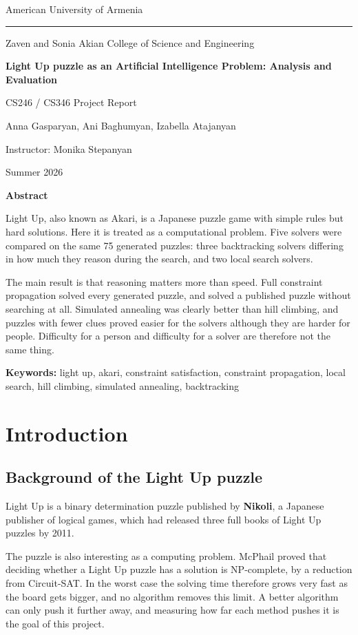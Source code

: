 \documentclass[12pt]{report}
\def\maketitle{
    \thispagestyle{empty}
    \begin{center}
        \vskip 4pt
        {\Large American University of Armenia \par}
        \vskip -7pt
        \rule{13cm}{0.05em} \par
        {\large Zaven and Sonia Akian College of Science and Engineering \par}
    \end{center}
    \vfill
    \begin{center}
        {\Huge \textbf{Light Up puzzle as an Artificial Intelligence Problem: Analysis and Evaluation} \par}
        \vspace{5mm}
        {\Large CS246 / CS346 Project Report \par}
        \vfill
        {\Large Anna Gasparyan, Ani Baghumyan, Izabella Atajanyan \par}
        \vspace{3mm}
        {\Large Instructor: Monika Stepanyan \par}
    \end{center}
    \vfill
    \begin{center}
        {\large Summer 2026 \par}
    \end{center}
    \cleardoublepage
}
\begin{document}
\maketitle

\begin{center}
    {\LARGE \textbf{Abstract}}
\end{center}
\vspace{5mm}

Light Up, also known as Akari, is a Japanese puzzle game with simple rules but hard solutions. Here it is treated as a computational problem. Five solvers were compared on the same 75 generated puzzles: three backtracking solvers differing in how much they reason during the search, and two local search solvers.

The main result is that reasoning matters more than speed. Full constraint propagation solved every generated puzzle, and solved a published puzzle without searching at all. Simulated annealing was clearly better than hill climbing, and puzzles with fewer clues proved easier for the solvers although they are harder for people. Difficulty for a person and difficulty for a solver are therefore not the same thing.


\vspace{2mm}
\textbf{Keywords:}  light up, akari, constraint satisfaction, constraint propagation, local search, hill climbing, simulated annealing, backtracking


\newpage

\tableofcontents
\listoffigures
\listoftables
\newpage

\chapter{Introduction}
\section{Background of the Light Up puzzle}
\indent 

Light Up is a binary determination puzzle published by \textbf{Nikoli}\cite{nikoli}, a Japanese publisher of logical games, which had released three full books of Light Up puzzles by 2011.

The puzzle is also interesting as a computing problem. McPhail\cite{mcphail} proved that deciding whether a Light Up puzzle has a solution is NP-complete, by a reduction from Circuit-SAT. In the worst case the solving time therefore grows very fast as the board gets bigger, and no algorithm removes this limit. A better algorithm can only push it further away, and measuring how far each method pushes it is the goal of this project.
\end{document}
